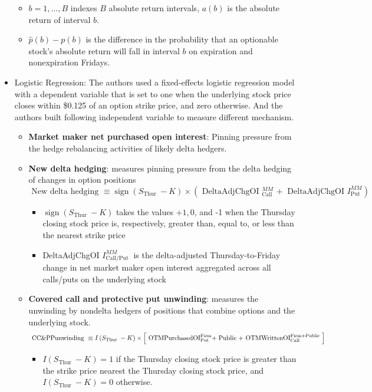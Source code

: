 \documentclass[10pt]{report}
\begin{document}
\begin{itemize}
$$$$
\begin{itemize}
    \item $b=1, \ldots, B$ indexes $B$ absolute return intervals, $a(b)$ is the absolute return of interval $b$.
    \item $\hat{p}(b)-p(b)$ is the difference in the probability that an optionable stock's absolute return will fall in interval $b$ on expiration and nonexpiration Fridays.
\end{itemize}
\item Logistic Regression: The authors used a fixed-effects logistic regression model with a dependent variable that is set to one when the underlying stock price closes within \$0.125 of an option strike price, and zero
otherwise. And the authors built following independent variable to measure different mechanism.
\begin{itemize}
    \item \textbf{Market maker net purchased open interest}: Pinning pressure from the hedge rebalancing activities of likely delta hedgers.
    \item \textbf{New delta hedging}: measures pinning pressure from the delta hedging of changes in option positions
$$
\text { New delta hedging }\equiv \operatorname{sign}\left(S_{\text {Thur }}-K\right) \times\left(\text { DeltaAdjChgOI }{ }_{\text {Call }}^{M M}+\text { DeltaAdjChgOI } I_{\text {Put }}^{M M}\right)
$$ 
\begin{itemize}
    \item $\operatorname{sign}\left(S_{\text {Thur }}-K\right)$ takes the values $+1,0$, and -1 when the Thursday closing stock price is, respectively, greater than, equal to, or less than the nearest strike price
    \item DeltaAdjChgOI $I_{\text {Call/Put }}^{M M}$ is the delta-adjusted Thursday-to-Friday change in net market maker open interest aggregated across all calls/puts on the underlying stock
\end{itemize}
    \item \textbf{Covered call and protective put unwinding}: measures the unwinding by nondelta hedgers of positions that combine options and the underlying stock.
    $$
\text { CC\&PPunwinding }\\
 \equiv I\left(S_{\text {Thur }}-K\right) \times\left[\text { OTMPurchasedOI} _{\text {Put}}^{\text {Firm}}+\right.\text {Public} \left.+\text { OTMWrittenOI}_{\text {Call }}^{\text {Firm}+ \text {Public }}\right]
$$
\begin{itemize}
    \item $I\left(S_{\text {Thur }}-K\right)=1$ if the Thursday closing stock price is greater than the strike price nearest the Thursday closing stock price, and $I\left(S_{\text {Thur }}-K\right)=0$ otherwise. 

\end{itemize}
\end{itemize}
\end{itemize}
\end{document}
